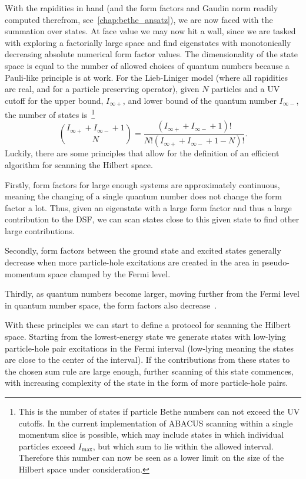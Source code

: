 \documentclass[11pt, a4paper]{report} %
\begin{document}
With the rapidities in hand (and the form factors and Gaudin norm readily computed therefrom, see~\cref{chap:bethe_ansatz}), we are now faced with the summation over states.
At face value we may now hit a wall, since we are tasked with exploring a factorially large space and find eigenstates with monotonically decreasing absolute numerical form factor values.
The dimensionality of the state space is equal to the number of allowed choices of quantum numbers because a Pauli-like principle is at work.
For the Lieb-Liniger model (where all rapidities are real, and for a particle preserving operator), given $N$ particles and a UV cutoff for the upper bound, $I_{\infty+}$, and lower bound of the quantum number $I_{\infty-}$, the number of states is~\cite{Caux2009}\footnote{This is the number of states if particle Bethe numbers can not exceed the UV cutoffs. In the current implementation of ABACUS scanning within a single momentum slice is possible, which may include states in which individual particles exceed \(I_{\max}\), but which sum to lie within the allowed interval. Therefore this number can now be seen as a lower limit on the size of the Hilbert space under consideration.}
\begin{equation}
  \binom{I_{\infty+} + I_{\infty-} + 1}{N} = \frac{(I_{\infty+} + I_{\infty-} + 1)!}{N!(I_{\infty+} + I_{\infty-} + 1 - N)!}.
\end{equation}
Luckily, there are some principles that allow for the definition of an efficient algorithm for scanning the Hilbert space.

Firstly, form factors for large enough systems are approximately continuous, meaning the changing of a single quantum number does not change the form factor a lot.
Thus, given an eigenstate with a large form factor and thus a large contribution to the DSF, we can scan states close to this given state to find other large contributions.

Secondly, form factors between the ground state and excited states generally decrease when more particle-hole excitations are created in the area in pseudo-momentum space clamped by the Fermi level.

Thirdly, as quantum numbers become larger, moving further from the Fermi level in quantum number space, the form factors also decrease~\cite{Caux2009}.

With these principles we can start to define a protocol for scanning the Hilbert space.
Starting from the lowest-energy state we generate states with low-lying particle-hole pair excitations in the Fermi interval (low-lying meaning the states are close to the center of the interval).
If the contributions from these states to the chosen sum rule are large enough, further scanning of this state commences, with increasing complexity of the state in the form of more particle-hole pairs.
\end{document}
